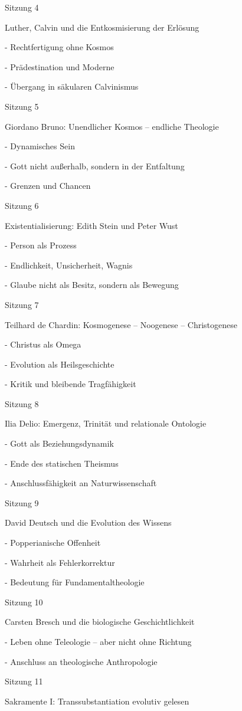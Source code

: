 \documentclass[
  ngerman,
]{article}
\begin{document}
Sitzung 4

Luther, Calvin und die Entkosmisierung der Erlösung

- Rechtfertigung ohne Kosmos

- Prädestination und Moderne

- Übergang in säkularen Calvinismus

Sitzung 5

Giordano Bruno: Unendlicher Kosmos -- endliche Theologie

- Dynamisches Sein

- Gott nicht außerhalb, sondern in der Entfaltung

- Grenzen und Chancen

Sitzung 6

Existentialisierung: Edith Stein und Peter Wust

- Person als Prozess

- Endlichkeit, Unsicherheit, Wagnis

- Glaube nicht als Besitz, sondern als Bewegung

Sitzung 7

Teilhard de Chardin: Kosmogenese -- Noogenese -- Christogenese

- Christus als Omega

- Evolution als Heilsgeschichte

- Kritik und bleibende Tragfähigkeit

Sitzung 8

Ilia Delio: Emergenz, Trinität und relationale Ontologie

- Gott als Beziehungsdynamik

- Ende des statischen Theismus

- Anschlussfähigkeit an Naturwissenschaft

Sitzung 9

David Deutsch und die Evolution des Wissens

- Popperianische Offenheit

- Wahrheit als Fehlerkorrektur

- Bedeutung für Fundamentaltheologie

Sitzung 10

Carsten Bresch und die biologische Geschichtlichkeit

- Leben ohne Teleologie -- aber nicht ohne Richtung

- Anschluss an theologische Anthropologie

Sitzung 11

Sakramente I: Transsubstantiation evolutiv gelesen
\end{document}
